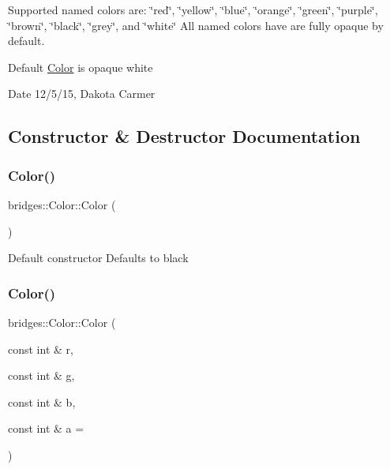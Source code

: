 Supported named colors are\+: \char`\"{}red\char`\"{}, \char`\"{}yellow\char`\"{}, \char`\"{}blue\char`\"{}, \char`\"{}orange\char`\"{}, \char`\"{}green\char`\"{}, \char`\"{}purple\char`\"{}, \char`\"{}brown\char`\"{}, \char`\"{}black\char`\"{}, \char`\"{}grey\char`\"{}, and \char`\"{}white\char`\"{} All named colors have are fully opaque by default.

Default \mbox{\hyperlink{classbridges_1_1_color}{Color}} is opaque white

\begin{DoxyDate}{Date}
12/5/15, Dakota Carmer 
\end{DoxyDate}


\subsection{Constructor \& Destructor Documentation}
\mbox{\label{classbridges_1_1_color_ab89df8fea283d33585380ea91d78bbee}} 
\subsubsection{\texorpdfstring{Color()}{Color()}\hspace{0.1cm}{\footnotesize\ttfamily [1/3]}}
{\footnotesize\ttfamily bridges\+::\+Color\+::\+Color (\begin{DoxyParamCaption}{ }\end{DoxyParamCaption})\hspace{0.3cm}{\ttfamily [inline]}}

Default constructor Defaults to black \mbox{\label{classbridges_1_1_color_aa861c0dc7729008cc4f886f235198181}} 
\subsubsection{\texorpdfstring{Color()}{Color()}\hspace{0.1cm}{\footnotesize\ttfamily [2/3]}}
{\footnotesize\ttfamily bridges\+::\+Color\+::\+Color (\begin{DoxyParamCaption}\item[{const int \&}]{r,  }\item[{const int \&}]{g,  }\item[{const int \&}]{b,  }\item[{const int \&}]{a = {} }\end{DoxyParamCaption})\hspace{0.3cm}{\ttfamily [inline]}}

